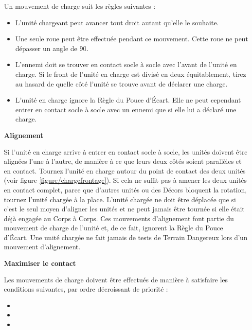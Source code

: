 Un mouvement de charge suit les règles suivantes :
\begin{itemize}[label={-}]
\item L'unité chargeant peut avancer tout droit autant qu'elle le souhaite.
\item Une seule roue peut être effectuée pendant ce mouvement. Cette roue ne peut dépasser un angle de 90{\text{\degree}}.
\item L'ennemi doit se trouver en contact socle à socle avec l'avant de l'unité en charge. Si le front de l'unité en charge est divisé en deux équitablement, tirez au hasard de quelle côté l'unité se trouve avant de déclarer une charge.
\item L'unité en charge ignore la Règle du Pouce d'Écart. Elle ne peut cependant entrer en contact socle à socle avec un ennemi que si elle lui a déclaré une charge.
\end{itemize}

\noindent\textbf{Alignement}

Si l'unité en charge arrive à entrer en contact socle à socle, les unités doivent être alignées l'une à l'autre, de manière à ce que leurs deux côtés soient parallèles et en contact. Tournez l'unité en charge autour du point de contact des deux unités (voir figure \ref{figure/chargefrontage}). Si cela ne suffit pas à amener les deux unités en contact complet, parce que d'autres unités ou des Décors bloquent la rotation, tournez l'unité chargée à la place. L'unité chargée ne doit être déplacée que si c'est le seul moyen d'aligner les unités et ne peut jamais être tournée si elle était déjà engagée au Corps à Corps. Ces mouvements d'alignement font partie du mouvement de charge de l'unité et, de ce fait, ignorent la Règle du Pouce d'Écart. Une unité chargée ne fait jamais de tests de Terrain Dangereux lors d'un mouvement d'alignement.

\noindent\textbf{Maximiser le contact}

Les mouvements de charge doivent être effectués de manière à satisfaire les conditions suivantes, par ordre décroissant de priorité :

\begin{itemize}[label={-}]
\item {}
\item {}
\item {}
\end{itemize}

